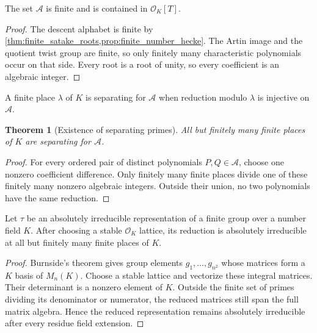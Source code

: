 \documentclass{aomart}
\newtheorem{theorem}{Theorem}[section]
\theoremstyle{definition}
\theoremstyle{remark}
\newcommand{\OO}{\mathcal O}
\newcommand{\calA}{\mathcal A}
\begin{document}
\begin{proposition}\label{prop:finite_alphabet}
The set \(\calA\) is finite and is contained in \(\OO_K[T]\).
\end{proposition}

\begin{proof}
The descent alphabet is finite by \cref{thm:finite_satake_roots,prop:finite_number_hecke}. The Artin image and the quotient twist group are finite, so only finitely many characteristic polynomials occur on that side. Every root is a root of unity, so every coefficient is an algebraic integer.
\end{proof}

\begin{definition}\label{def:separating_prime}
A finite place \(\lambda\) of \(K\) is separating for \(\calA\) when reduction modulo \(\lambda\) is injective on \(\calA\).
\end{definition}

\begin{theorem}[Existence of separating primes]\label{thm:separating_primes}
All but finitely many finite places of \(K\) are separating for \(\calA\).
\end{theorem}

\begin{proof}
For every ordered pair of distinct polynomials \(P,Q\in\calA\), choose one nonzero coefficient difference. Only finitely many finite places divide one of these finitely many nonzero algebraic integers. Outside their union, no two polynomials have the same reduction.
\end{proof}

\begin{lemma}\label{lem:good_irreducible_reduction}
Let \(\tau\) be an absolutely irreducible representation of a finite group over a number field \(K\). After choosing a stable \(\OO_K\) lattice, its reduction is absolutely irreducible at all but finitely many finite places of \(K\).
\end{lemma}

\begin{proof}
Burnside's theorem gives group elements \(g_1,\ldots,g_{n^2}\) whose matrices form a \(K\) basis of \(M_n(K)\). Choose a stable lattice and vectorize these integral matrices. Their determinant is a nonzero element of \(K\). Outside the finite set of primes dividing its denominator or numerator, the reduced matrices still span the full matrix algebra. Hence the reduced representation remains absolutely irreducible after every residue field extension.
\end{proof}
\end{document}
